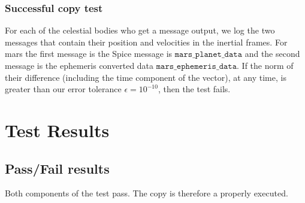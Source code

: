 \documentclass[]{BasiliskReportMemo}
\begin{document}
\subsubsection*{Successful copy test}

For each of the celestial bodies who get a message output, we log the two messages that contain their position and velocities in the inertial frames. For mars the first message is the Spice message is $\texttt{mars$\_$planet$\_$data}$
and the second message is the ephemeris converted data $\texttt{mars$\_$ephemeris$\_$data}$. If the norm of their difference (including the time component of the vector), at any time, is greater than our error tolerance $\epsilon =10^{-10}$, then the test fails.


\section{Test Results}

\subsection{Pass/Fail results}

Both components of the test pass. The copy is therefore a properly executed.
\end{document}
